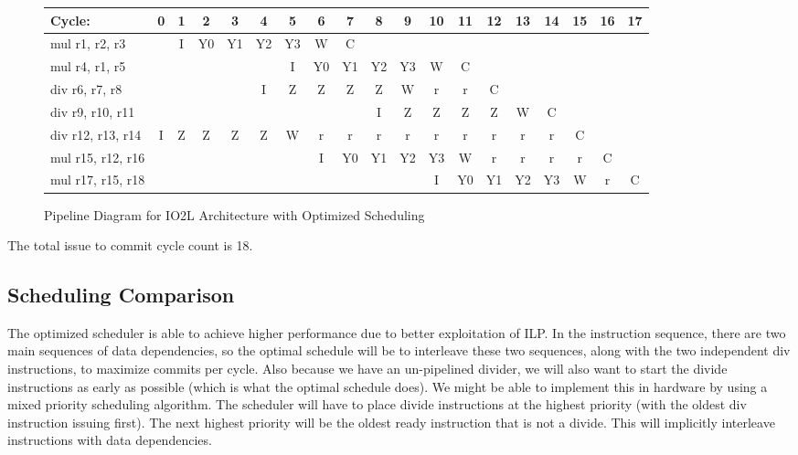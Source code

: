 \documentclass[10pt]{article}
\begin{document}
\begin{figure}[H]
\centering
{\setlength{\tabcolsep}{2pt}
\begin{tabular}{|l!{\vrule width 1.5pt}c|c|c|c|c|c|c|c|c|c|c|c|c|c|c|c|c|c!{\vrule width 1.5pt}}
\hline
Cycle:            & 0 & 1 & 2 & 3 & 4 & 5 & 6 & 7 & 8 & 9 & 10 & 11 & 12 & 13 & 14 & 15 & 16 & 17 \\ \hline
mul r1, r2, r3    &   & I & Y0& Y1& Y2& Y3& W & C &   &   &    &    &    &    &    &    &    &    \\ \hline
mul r4, r1, r5    &   &   &   &   &   & I & Y0& Y1& Y2& Y3& W  & C  &    &    &    &    &    &    \\ \hline
div r6, r7, r8    &   &   &   &   & I & Z & Z & Z & Z & W & r  & r  & C  &    &    &    &    &    \\ \hline
div r9, r10, r11  &   &   &   &   &   &   &   &   & I & Z & Z  & Z  & Z  & W  & C  &    &    &    \\ \hline
div r12, r13, r14 & I & Z & Z & Z & Z & W & r & r & r & r & r  & r  & r  & r  & r  & C  &    &    \\ \hline
mul r15, r12, r16 &   &   &   &   &   &   & I & Y0& Y1& Y2& Y3 & W  & r  & r  & r  & r  & C  &    \\ \hline
mul r17, r15, r18 &   &   &   &   &   &   &   &   &   &   & I  & Y0 & Y1 & Y2 & Y3 & W  & r  & C  \\ \hline
\end{tabular}
}
\caption{Pipeline Diagram for IO2L Architecture with Optimized Scheduling}
\end{figure}

The total issue to commit cycle count is 18.

\subsection{Scheduling Comparison}

The optimized scheduler is able to achieve higher performance due to better exploitation of ILP. In the instruction sequence, there are two main sequences of data dependencies, so the optimal schedule will be to interleave these two sequences, along with the two independent div instructions, to maximize commits per cycle. Also because we have an un-pipelined divider, we will also want to start the divide instructions as early as possible (which is what the optimal schedule does). We might be able to implement this in hardware by using a mixed priority scheduling algorithm. The scheduler will have to place divide instructions at the highest priority (with the oldest div instruction issuing first). The next highest priority will be the oldest ready instruction that is not a divide. This will implicitly interleave instructions with data dependencies. 
\end{document}
